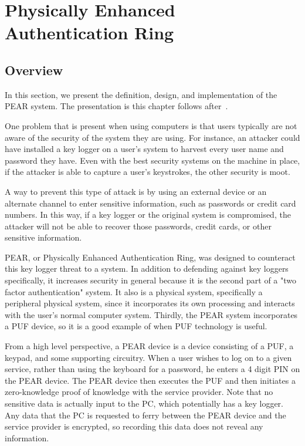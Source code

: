 
\chapter{Physically Enhanced Authentication Ring}
\label{chapter:pear}

\section{Overview}
In this section, we present the definition, design, and implementation of the PEAR system. The presentation is this chapter
follows after~\cite{PEAR}.

One problem that is present when using computers is that users typically are not aware of the security of the system
they are using. For instance, an attacker could have installed a key logger on a user's system to harvest every user name
and password they have. Even with the best security systems on the machine in place, if the attacker is able to capture
a user's keystrokes, the other security is moot. 

A way to prevent this type of attack is by using an external device or an alternate channel to enter sensitive information,
such as passwords or credit card numbers. In this way, if a key logger or the original system is compromised, the attacker
will not be able to recover those passwords, credit cards, or other sensitive information.

PEAR, or Physically Enhanced Authentication Ring, was designed to counteract this key logger threat to a system. In addition
to defending against key loggers specifically, it increases security in general because it is the second part of a "two factor
authentication" system. It also is a physical system, specifically a peripheral physical system, since it incorporates its
own processing and interacts with the user's normal computer system. Thirdly, the PEAR system incorporates a PUF device,
so it is a good example of when PUF technology is useful.

From a high level perspective, a PEAR device is a device consisting of a PUF, a keypad, and some supporting circuitry. When
a user wishes to log on to a given service, rather than using the keyboard for a password, he enters a 4 digit PIN on the PEAR
device. The PEAR device then executes the PUF and then initiates a zero-knowledge proof of knowledge with the service
provider. Note that no sensitive data is actually input to the PC, which potentially has a key logger. Any data that the PC
is requested to ferry between the PEAR device and the service provider is encrypted, so recording this data does not reveal
any information.

